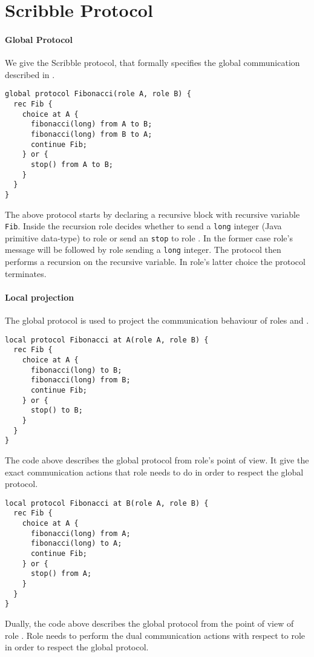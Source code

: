 \section{Scribble Protocol}
\label{sec:scribble}

\paragraph{Global Protocol}
We give the Scribble protocol, that formally specifies the
global communication described in .
%
\begin{lstlisting}[caption={Global Protocol}]
global protocol Fibonacci(role A, role B) {
  rec Fib {
    choice at A {
      fibonacci(long) from A to B;
      fibonacci(long) from B to A;
      continue Fib;
    } or {
      stop() from A to B;
    }
  }
}
\end{lstlisting}

The above protocol starts by declaring a recursive block
with recursive variable \lstinline|Fib|.
Inside the recursion role \A decides whether to send
a \lstinline|long| integer (Java primitive data-type)
to role \B or send an \lstinline|stop| to role \B.
In the former case role's \A message will be followed
by role \B sending a \lstinline|long| integer. The protocol
then performs a recursion on the recursive variable.
In role's \A latter choice the protocol terminates.

\paragraph{Local projection}
The global protocol is used to project the communication
behaviour of roles \A and \B.

\begin{lstlisting}[caption={Local Protocol for Role \A}]
local protocol Fibonacci at A(role A, role B) {
  rec Fib {
    choice at A {
      fibonacci(long) to B;
      fibonacci(long) from B;
      continue Fib;
    } or {
      stop() to B;
    }
  }
}
\end{lstlisting}

The code above describes the global protocol from role's \A
point of view. It give the exact communication actions that
role \A needs to do in order to respect the global protocol.

\begin{lstlisting}[caption={Local Protocol for Role \B}]
local protocol Fibonacci at B(role A, role B) {
  rec Fib {
    choice at A {
      fibonacci(long) from A;
      fibonacci(long) to A;
      continue Fib;
    } or {
      stop() from A;
    }
  }
}
\end{lstlisting}

Dually, the code above describes the global protocol from
the point of view of role \B. Role \B needs to perform
the dual communication actions with respect to role \A
in order to respect the global protocol.



